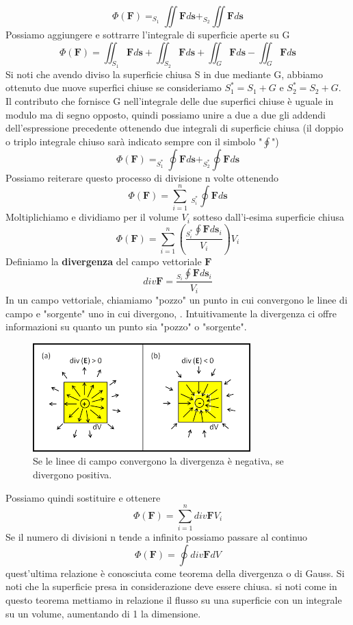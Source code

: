 \documentclass[
10pt, %
a4paper, %
oneside, %
headinclude,footinclude, %
BCOR5mm, %
]{scrartcl}
\begin{document}
\[\Phi(\mathbf{F}) = _{S_1}\iint \mathbf{F}d\mathbf{s}+_{S_2}\iint \mathbf{F}d\mathbf{s}\]
Possiamo aggiungere e sottrarre l'integrale di superficie aperte su G 
\[\Phi(\mathbf{F}) = \iint_{S_1} \mathbf{F}d\mathbf{s}+\iint_{S_2} \mathbf{F}d\mathbf{s}+\iint_{G} \mathbf{F}d\mathbf{s}-\iint_{G} \mathbf{F}d\mathbf{s}\]
Si noti che avendo diviso la superficie chiusa S in due mediante G, abbiamo ottenuto due nuove superfici chiuse se consideriamo \(S_1^* = S_1+G\) e \(S_2^* = S_2+G\). Il contributo che fornisce G nell'integrale delle due superfici chiuse è uguale in modulo ma di segno opposto, quindi possiamo unire a due a due gli addendi dell'espressione precedente ottenendo due integrali di superficie chiusa (il doppio o triplo integrale chiuso sarà indicato sempre con il simbolo "\(\oint\)")
\[\Phi(\mathbf{F}) = _{S_1^*}\oint \mathbf{F}d\mathbf{s}+_{S_2^*}\oint \mathbf{F}d\mathbf{s}\]
Possiamo reiterare questo processo di divisione n volte ottenendo
\[\Phi(\mathbf{F}) = \sum_{i=1}^{n}\ _{S_i^*}\oint \mathbf{F}d\mathbf{s}\]
Moltiplichiamo e dividiamo per il volume \(V_i\) sotteso dall'i-esima superficie chiusa
\[\Phi(\mathbf{F}) = \sum_{i=1}^{n}\left(\frac{_{S_i^*}\oint \mathbf{F}d\mathbf{s}_i}{V_i}\right)V_i\]
Definiamo la \textbf{divergenza} del campo vettoriale $\mathbf{F}$ 
\[div\mathbf{F} = \frac{_{S_i}\oint \mathbf{F}d\mathbf{s}_i}{V_i}\]
In un campo vettoriale, chiamiamo "pozzo" un punto in cui convergono le linee di campo e "sorgente" uno in cui divergono, . Intuitivamente la divergenza ci offre informazioni su quanto un punto sia "pozzo" o "sorgente". 
\begin{figure}[h!]
	\centering
	\includegraphics[width=0.6\linewidth]{../images/div}
	\caption{Se le linee di campo convergono la divergenza è negativa, se divergono positiva.}
	\label{fig:div}
\end{figure}
\FloatBarrier
Possiamo quindi sostituire e ottenere
\[\Phi(\mathbf{F}) = \sum_{i=1}^{n}div\mathbf{F}V_i\]
Se il numero di divisioni n tende a infinito possiamo passare al continuo 
\[\Phi(\mathbf{F}) = \oint div\mathbf{F}dV\]
quest'ultima relazione è conosciuta come teorema della divergenza o di Gauss. Si noti che la superficie presa in considerazione deve essere chiusa. si noti come in questo teorema mettiamo in relazione il flusso su una superficie con un integrale su un volume, aumentando di 1 la dimensione.\\
\end{document}
